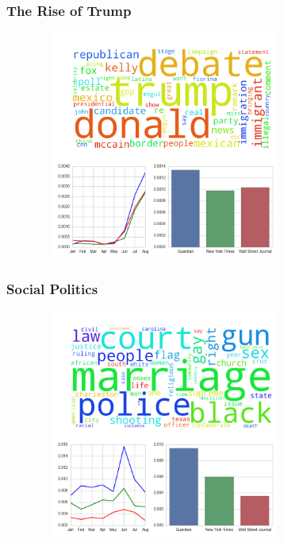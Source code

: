 \documentclass[11pt]{beamer}
\begin{document}

\begin{frame}
\frametitle{The Rise of Trump}

\begin{figure}
\centering
\includegraphics[width=85mm,height=75mm]{figures/source_topic7.png}
\end{figure} 

\end{frame}


\begin{frame}
\frametitle{Social Politics}

\begin{figure}
\centering
\includegraphics[width=85mm,height=75mm]{figures/source_topic4.png}
\end{figure} 

\end{frame}
\end{document}
